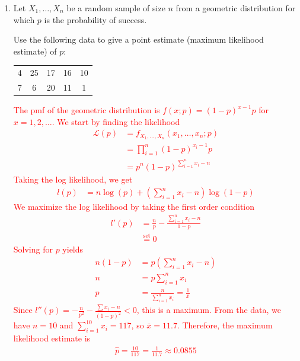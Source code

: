 \documentclass[12pt]{article} %
\newcommand{\Red}{\color{Red}}
\begin{document}
\begin{enumerate}
\begin{enumerate}[label=5.\arabic*]
\item Find $P(X_1=2,X_2=4)$. \\ {\Red Since $X_1$ and $X_2$ are independent, we have $$\begin{aligned}
    P(X_1 = 2, X_2 = 4) &= P(X_1 = 2) P(X_2 = 4) \\
    &= 0.0158
\end{aligned}$$}
\item Find $P(X_1+X_2=5)$. \\ {\Red Since $X_1$ and $X_2$ are independent, we have $X_1+X_2 \sim \text{Binom}(10, 0.3)$. So we have $$\begin{aligned}
    P(X_1 + X_2 = 5) &= 0.1029
\end{aligned}$$}
\end{enumerate}
\newpage
\item Let $X_1, \dots, X_n$ be a random sample of size $n$ from a geometric distribution for which $p$ is the probability of success. 

Use the following data to give a point estimate (maximum likelihood estimate) of $p$:
%
\begin{center}
\begin{tabular}{c c c c c} 
4& 25& 17& 16&10\\
7& 6& 20& 11& 1
\end{tabular}
\end{center}
%
\textcolor{red}{The pmf of the geometric distribution is $f(x;p) = (1-p)^{x-1}p$ for $x = 1, 2, \dots$. We start by finding the likelihood $$\begin{aligned}
    \mathcal{L}(p) &= f_{X_1, \dots, X_n}(x_1, \dots, x_n; p) \\
    &= \prod_{i=1}^n (1-p)^{x_i - 1} p \\
    &= p^n (1-p)^{\sum_{i=1}^n x_i - n}
\end{aligned}$$ Taking the log likelihood, we get $$\begin{aligned}
    l(p) &= n \log(p) + \left(\sum_{i=1}^n x_i - n\right) \log(1-p)
\end{aligned}$$ We maximize the log likelihood by taking the first order condition $$\begin{aligned}
    l'(p) &= \frac{n}{p} - \frac{\sum_{i=1}^n x_i - n}{1-p} \\
    &\overset{\mathrm{set}}{=} 0
\end{aligned}$$ Solving for $p$ yields $$\begin{aligned}
    n(1-p) &= p\left(\sum_{i=1}^n x_i - n\right) \\
    n &= p \sum_{i=1}^n x_i \\
    \hat p &= \frac{n}{\sum_{i=1}^n x_i} = \frac{1}{\bar{x}}
\end{aligned}$$ Since $l''(p) = -\frac{n}{p^2} - \frac{\sum x_i - n}{(1-p)^2} < 0$, this is a maximum. From the data, we have $n = 10$ and $\sum_{i=1}^{10} x_i = 117$, so $\bar{x} = 11.7$. Therefore, the maximum likelihood estimate is $$\begin{aligned}
    \hat p = \frac{10}{117} = \frac{1}{11.7} \approx 0.0855
\end{aligned}$$}


\end{enumerate}
\end{document}
